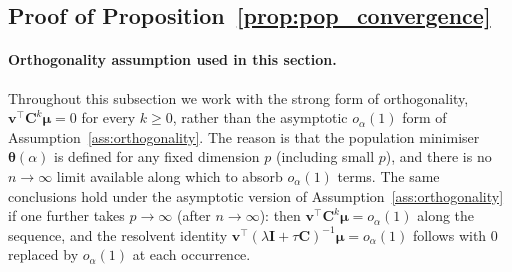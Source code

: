 \documentclass[11pt]{article}
\newcommand{\I}{\mathbf{I}}
\newcommand{\C}{\mathbf{C}}
\newcommand{\bv}{\mathbf{v}}
\newcommand{\bmu}{\boldsymbol{\mu}}
\newcommand{\btheta}{\boldsymbol{\theta}}
\begin{document}
\subsection{Proof of Proposition~\ref{prop:pop_convergence}}
\label{app:proof_pop_convergence}

\paragraph{Orthogonality assumption used in this section.}
Throughout this subsection we work with the strong form of
orthogonality, $\bv^\top\C^k\bmu = 0$ for every $k \geq 0$, rather
than the asymptotic $o_{\alpha}(1)$ form of
Assumption~\ref{ass:orthogonality}.
The reason is that the population minimiser $\btheta(\alpha)$ is
defined for any fixed dimension $p$ (including small $p$), and there
is no $n \to \infty$ limit available along which to absorb $o_{\alpha}(1)$
terms.
The same conclusions hold under the asymptotic version of
Assumption~\ref{ass:orthogonality} if one further takes
$p \to \infty$ (after $n \to \infty$): then $\bv^\top\C^k\bmu = o_{\alpha}(1)$
along the sequence, and the resolvent identity
$\bv^\top(\lambda\I+\tau\C)^{-1}\bmu = o_{\alpha}(1)$ follows with $0$ replaced by
$o_{\alpha}(1)$ at each occurrence.
\end{document}
